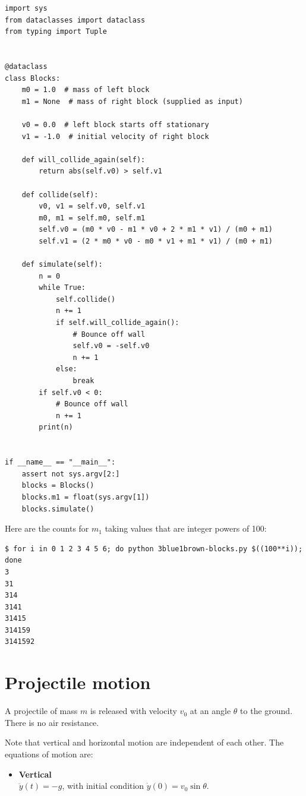 \begin{verbatim}
import sys
from dataclasses import dataclass
from typing import Tuple


@dataclass
class Blocks:
    m0 = 1.0  # mass of left block
    m1 = None  # mass of right block (supplied as input)

    v0 = 0.0  # left block starts off stationary
    v1 = -1.0  # initial velocity of right block

    def will_collide_again(self):
        return abs(self.v0) > self.v1

    def collide(self):
        v0, v1 = self.v0, self.v1
        m0, m1 = self.m0, self.m1
        self.v0 = (m0 * v0 - m1 * v0 + 2 * m1 * v1) / (m0 + m1)
        self.v1 = (2 * m0 * v0 - m0 * v1 + m1 * v1) / (m0 + m1)

    def simulate(self):
        n = 0
        while True:
            self.collide()
            n += 1
            if self.will_collide_again():
                # Bounce off wall
                self.v0 = -self.v0
                n += 1
            else:
                break
        if self.v0 < 0:
            # Bounce off wall
            n += 1
        print(n)


if __name__ == "__main__":
    assert not sys.argv[2:]
    blocks = Blocks()
    blocks.m1 = float(sys.argv[1])
    blocks.simulate()
\end{verbatim}

Here are the counts for $m_1$ taking values that are integer powers of 100:

\begin{verbatim}
$ for i in 0 1 2 3 4 5 6; do python 3blue1brown-blocks.py $((100**i)); done
3
31
314
3141
31415
314159
3141592
\end{verbatim}

\section{Projectile motion}

A projectile of mass $m$ is released with velocity $v_0$ at an angle $\theta$ to the ground. There
is no air resistance.

Note that vertical and horizontal motion are independent of each other. The equations of motion are:

\begin{itemize}
\item {\bf Vertical}\\
  $\ddot{y}(t) = -g$, with initial condition $\dot{y}(0) = v_0\sin\theta$.
\end{itemize}

